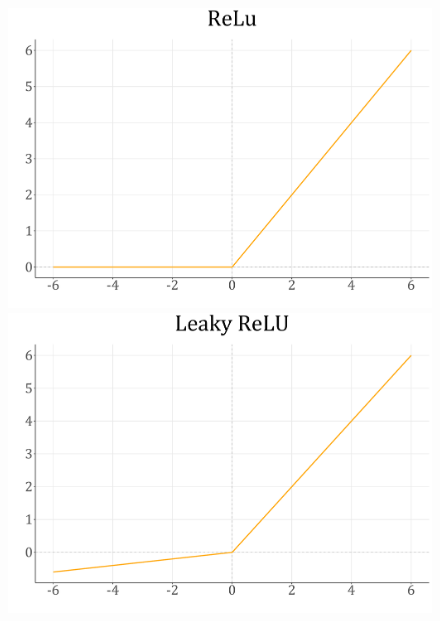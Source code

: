 \documentclass[spanish,a4paper,12pt,twoside]{report}
\begin{document}
    \begin{figure}[H]
      \begin{minipage}{0.49\textwidth}
        \centering
        \includegraphics[width = 1\linewidth]{resources/Fig12_5.pdf}
      \end{minipage}
      \begin{minipage}{0.49\textwidth}
        \centering
        \includegraphics[width = 1\linewidth]{resources/Fig12_6.pdf}
      \end{minipage}
    \end{figure}
\end{document}
